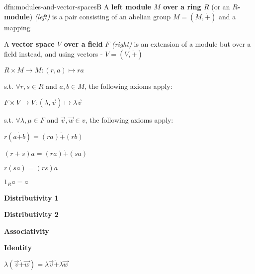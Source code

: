 \documentclass[landscape, 8pt]{extarticle}
\begin{document}
\begin{multicols}{3}
\begin{dfn}{dfn:modules-and-vector-spaces}{B}
    A \textbf{left module $M$ over a ring $R$} (or an \textbf{$R$-module}) \textit{(left)} is a pair consisting of an abelian group $M = (M, \dot{+})$ and a mapping

    A \textbf{vector space $V$ over a field} $F$ \textit{(right)} is an extension of a module but over a field instead, and using vectors - $V = (V, \dot{+})$
    
    \vspace{-15pt}
    \setlength{\columnseprule}{0.5pt}
    \begin{multicols}{2}
        \begin{center}
            $R \times M \to M : (r, a)\mapsto ra$

        \end{center}
        s.t. $\forall r, s\in R$ and $a,b\in M$, the following axioms apply:


        \columnbreak
        \begin{center}
            $F \times V \to V : (\lambda, \vec{v})\mapsto \lambda \vec{v}$
        \end{center}
        s.t. $\forall \lambda, \mu\in F$ and $\vec{v},\vec{w}\in v$, the following axioms apply:
    \end{multicols}

    \vspace{-25pt}
    \setlength{\columnseprule}{0pt}
    \begin{multicols}{3}
        \begin{flushright}
            $r(a \dot{+} b) = (ra) \dot{+} (rb)$

            $(r + s)a = (ra) \dot{+} (sa)$

            $r (sa) = (rs) a$

            $1_{R}a = a$
        \end{flushright}


        \columnbreak
        \begin{center}
            \textbf{Distributivity 1}

            \textbf{Distributivity 2}

            \textbf{Associativity}

            \textbf{Identity}
        \end{center}

        \columnbreak

            $\lambda(\vec{v} \dot{+} \vec{w}) = \lambda\vec{v} \dot{+} \lambda \vec{w}$


\end{multicols}
\end{dfn}
\end{multicols}
\end{document}
